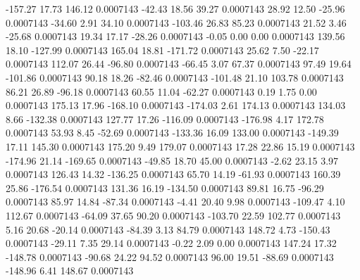      -157.27       17.73      146.12     0.0007143
      -42.43       18.56       39.27     0.0007143
       28.92       12.50      -25.96     0.0007143
      -34.60        2.91       34.10     0.0007143
     -103.46       26.83       85.23     0.0007143
       21.52        3.46      -25.68     0.0007143
       19.34       17.17      -28.26     0.0007143
       -0.05        0.00        0.00     0.0007143
      139.56       18.10     -127.99     0.0007143
      165.04       18.81     -171.72     0.0007143
       25.62        7.50      -22.17     0.0007143
      112.07       26.44      -96.80     0.0007143
      -66.45        3.07       67.37     0.0007143
       97.49       19.64     -101.86     0.0007143
       90.18       18.26      -82.46     0.0007143
     -101.48       21.10      103.78     0.0007143
       86.21       26.89      -96.18     0.0007143
       60.55       11.04      -62.27     0.0007143
        0.19        1.75        0.00     0.0007143
      175.13       17.96     -168.10     0.0007143
     -174.03        2.61      174.13     0.0007143
      134.03        8.66     -132.38     0.0007143
      127.77       17.26     -116.09     0.0007143
     -176.98        4.17      172.78     0.0007143
       53.93        8.45      -52.69     0.0007143
     -133.36       16.09      133.00     0.0007143
     -149.39       17.11      145.30     0.0007143
      175.20        9.49      179.07     0.0007143
       17.28       22.86       15.19     0.0007143
     -174.96       21.14     -169.65     0.0007143
      -49.85       18.70       45.00     0.0007143
       -2.62       23.15        3.97     0.0007143
      126.43       14.32     -136.25     0.0007143
       65.70       14.19      -61.93     0.0007143
      160.39       25.86     -176.54     0.0007143
      131.36       16.19     -134.50     0.0007143
       89.81       16.75      -96.29     0.0007143
       85.97       14.84      -87.34     0.0007143
       -4.41       20.40        9.98     0.0007143
     -109.47        4.10      112.67     0.0007143
      -64.09       37.65       90.20     0.0007143
     -103.70       22.59      102.77     0.0007143
        5.16       20.68      -20.14     0.0007143
      -84.39        3.13       84.79     0.0007143
      148.72        4.73     -150.43     0.0007143
      -29.11        7.35       29.14     0.0007143
       -0.22        2.09        0.00     0.0007143
      147.24       17.32     -148.78     0.0007143
      -90.68       24.22       94.52     0.0007143
       96.00       19.51      -88.69     0.0007143
     -148.96        6.41      148.67     0.0007143
